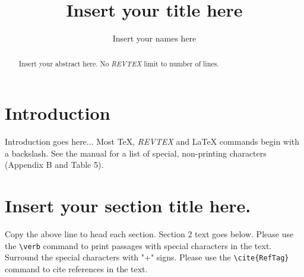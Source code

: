 %
%
%
%
%
%
%
\newcommand{\MF}{{\large{\manual META}\-{\manual FONT}}}
\newcommand{\manual}{rm}        %
\newcommand\bs{\char '134 }     %
%
%
%
%
%
\title{Insert your title here}
\author{Insert your names here}
\address{Insert the name of your University, company or Institute here}
%
\maketitle
\begin{abstract}                %
 Insert your abstract here.  No {\it REVTEX} limit to number of lines.
\end{abstract}
%
\section{Introduction}               %
Introduction goes here...
 Most TeX, {\it REVTEX} and LaTeX commands begin with a backslash.
 See the manual for a list of special, non-printing characters
 (Appendix B and Table 5).

\section{Insert your section title here.}
 Copy the above line to head each section.  Section 2 text
 goes below.
 Please use the \verb+\verb+ command to print passages with
 special characters in the text.  Surround the special
 characters with "+" signs.
 Please use the \verb+\cite{RefTag}+\cite{RefTag} command to
 cite references in the text.

